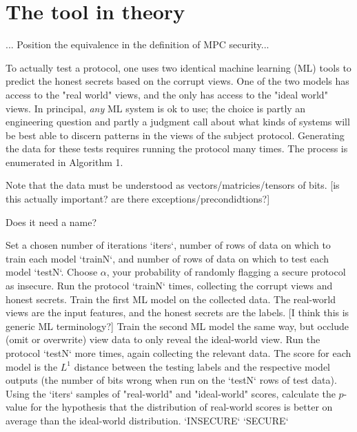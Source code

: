 \documentclass[conference]{IEEEtran}
\begin{document}
\section{The tool in theory}

... Position the equivalence in the definition of MPC security...

To actually test a protocol, one uses two identical machine learning (ML) tools to predict the honest secrets based on the corrupt views.
One of the two models has access to the "real world" views, and the only has access to the "ideal world" views.
In principal, \textit{any} ML system is ok to use; the choice is partly an engineering question
and partly a judgment call about what kinds of systems will be best able to discern patterns in the views of the subject protocol.
Generating the data for these tests requires running the protocol many times.
The process is enumerated in Algorithm 1.

Note that the data must be understood as vectors/matricies/tensors of bits. [is this actually important? are there exceptions/precondidtions?]

\begin{algorithm}  %
  \caption{Does it need a name?}
  \begin{algorithmic}[1]
  \STATE Set a chosen number of iterations `iters`,
         number of rows of data on which to train each model `trainN`,
         and number of rows of data on which to test each model `testN`.
  \STATE Choose $\alpha$, your probability of randomly flagging a secure protocol as insecure.
    \STATE Run the protocol `trainN` times, collecting the corrupt views and honest secrets.
    \STATE Train the first ML model on the collected data.
           The real-world views are the input features, and the honest secrets are the labels. [I think this is generic ML terminology?]
    \STATE Train the second ML model the same way, but occlude (omit or overwrite) view data to only reveal the ideal-world view.
    \STATE Run the protocol `testN` more times, again collecting the relevant data.
    \STATE The score for each model is the $L^1$ distance between the testing labels and the respective model outputs
           (\ie the number of bits wrong when run on the `testN` rows of test data).
  \ENDFOR
  \STATE Using the `iters` samples of "real-world" and "ideal-world" scores,
         calculate the $p$-value for the hypothesis that the distribution of real-world scores is better on average than the ideal-world distribution.
   \RETURN `INSECURE` \ELSE \RETURN `SECURE` \ENDIF
  \end{algorithmic}
\end{algorithm}
\end{document}
